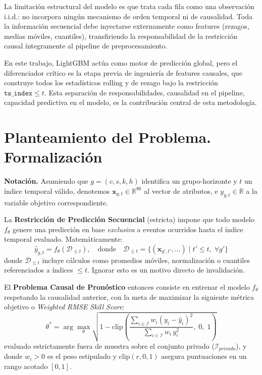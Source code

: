 \documentclass{article}
\begin{document}
La limitación estructural del modelo es que trata cada fila como una observación i.i.d.: no incorpora ningún mecanismo de orden temporal ni de causalidad. Toda la información secuencial debe inyectarse externamente como features (rezagos, medias móviles, cuantiles), transfiriendo la responsabilidad de la restricción causal íntegramente al pipeline de preprocesamiento.

En este trabajo, LightGBM actúa como motor de predicción global, pero el diferenciador crítico es la etapa previa de ingeniería de features causales, que construye todos los estadísticos rolling y de rezago bajo la restricción $\texttt{ts\_index} \leq t$. Esta separación de responsabilidades, causalidad en el pipeline, capacidad predictiva en el modelo, es la contribución central de esta metodología.


\section{Planteamiento del Problema. Formalización}

\textbf{Notación.} Asumiendo que $g = (c,s,k,h)$ identifica un grupo-horizonte y $t$ un índice temporal válido, denotemos $\mathbf{x}_{g,t} \in \mathbb{R}^{86}$ al vector de atributos, e $y_{g,t} \in \mathbb{R}$ a la variable objetivo correspondiente.

La \textbf{Restricción de Predicción Secuencial} (estricta) impone que todo modelo $f_\theta$ genere una predicción en base \emph{exclusiva} a eventos ocurridos hasta el índice temporal evaluado. Matemáticamente:
\[
  \hat{y}_{g,t} = f_\theta\!\left(\mathcal{D}_{\leq t}\right), \quad \text{donde} \quad
  \mathcal{D}_{\leq t} = \bigl\{(\mathbf{x}_{g',t'},\ldots) \mid t' \leq t,\;\forall g'\bigr\}
\]
donde $\mathcal{D}_{\leq t}$ incluye cálculos como promedios móviles, normalización o cuantiles referenciados a índices $\leq t$. Ignorar esto es un motivo directo de invalidación.

El \textbf{Problema Causal de Pronóstico} entonces consiste en entrenar el modelo $f_\theta$ respetando la causalidad anterior, con la meta de maximizar la siguiente métrica objetivo o \textit{Weighted RMSE Skill Score}:
\begin{equation}
  \theta^* = \arg\max_\theta \sqrt{1 - \mathrm{clip}\!\left(
    \frac{\sum_{i \in \mathcal{I}} w_i(y_i - \hat{y}_i)^2}
         {\sum_{i \in \mathcal{I}} w_i\,y_i^2},\;0,\;1\right)}
  \label{eq:score}
\end{equation}
evaluado estrictamente fuera de muestra sobre el conjunto privado ($\mathcal{I}_{privado}$), y donde $w_i > 0$ es el peso estipulado y $\mathrm{clip}(r,0,1)$ asegura puntuaciones en un rango acotado $[0, 1]$.
\end{document}

